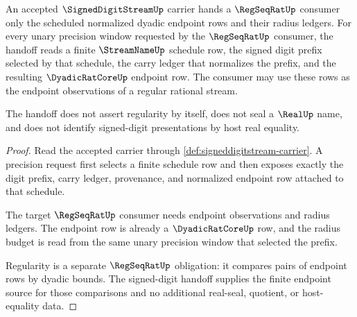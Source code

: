 \begin{theorem}
\label{thm:signeddigitstream-regseqrat-handoff}
An accepted $\SignedDigitStreamUp$ carrier hands a $\RegSeqRatUp$ consumer only the scheduled normalized dyadic endpoint rows and their radius ledgers. For every unary precision window requested by the $\RegSeqRatUp$ consumer, the handoff reads a finite $\StreamNameUp$ schedule row, the signed digit prefix selected by that schedule, the carry ledger that normalizes the prefix, and the resulting $\DyadicRatCoreUp$ endpoint row. The consumer may use these rows as the endpoint observations of a regular rational stream.

The handoff does not assert regularity by itself, does not seal a $\RealUp$ name, and does not identify signed-digit presentations by host real equality.
\end{theorem}
\begin{proof}
Read the accepted carrier through \autoref{def:signeddigitstream-carrier}. A precision request first selects a finite schedule row and then exposes exactly the digit prefix, carry ledger, provenance, and normalized endpoint row attached to that schedule.

The target $\RegSeqRatUp$ consumer needs endpoint observations and radius ledgers. The endpoint row is already a $\DyadicRatCoreUp$ row, and the radius budget is read from the same unary precision window that selected the prefix.

Regularity is a separate $\RegSeqRatUp$ obligation: it compares pairs of endpoint rows by dyadic bounds. The signed-digit handoff supplies the finite endpoint source for those comparisons and no additional real-seal, quotient, or host-equality data.
\end{proof}

